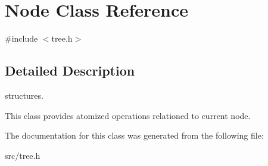 \hypertarget{classNode}{\section{Node Class Reference}
\label{classNode}
}


{\ttfamily \#include $<$tree.\-h$>$}



\subsection{Detailed Description}
structures.

This class provides atomized operations relationed to current node. 

The documentation for this class was generated from the following file\-:\begin{DoxyCompactItemize}
\item 
src/tree.\-h\end{DoxyCompactItemize}
